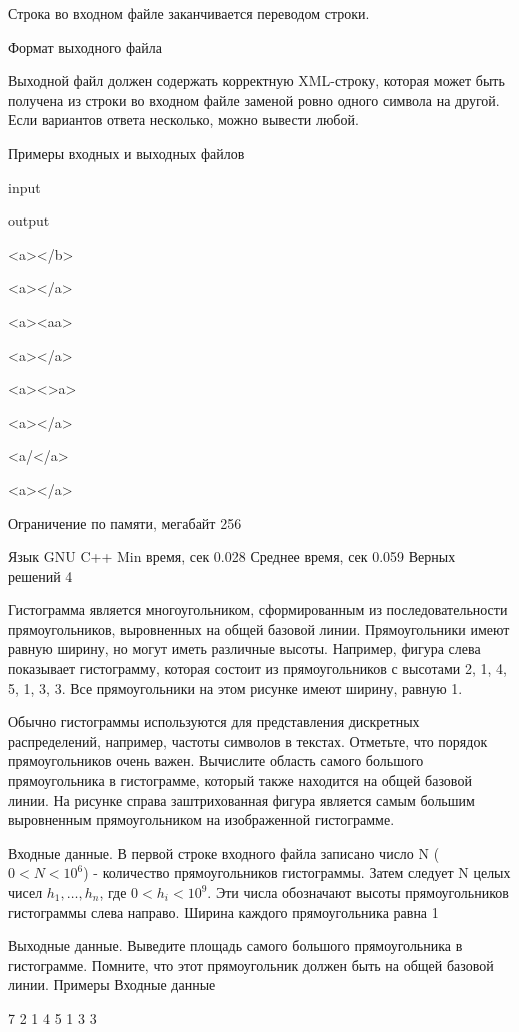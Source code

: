 \documentclass[]{article}
\begin{document}
\begin{enumerate}
Строка во входном файле заканчивается переводом строки.

Формат выходного файла

Выходной файл должен содержать корректную XML-строку, которая может быть получена из строки во входном файле заменой ровно одного символа на другой. Если вариантов ответа несколько, можно вывести любой.

Примеры входных и выходных файлов

input
	

output

<a></b>
	

<a></a>

<a><aa>
	

<a></a>

<a><>a>
	

<a></a>

<a/</a>
	

<a></a>


Ограничение по памяти, мегабайт	256
	
Язык	GNU C++
Min время, сек	0.028
Среднее время, сек	0.059
Верных решений	4

Гистограмма является многоугольником, сформированным из последовательности прямоугольников, выровненных на общей базовой линии. Прямоугольники имеют равную ширину, но могут иметь различные высоты. Например, фигура слева показывает гистограмму, которая состоит из прямоугольников с высотами 2, 1, 4, 5, 1, 3, 3. Все прямоугольники на этом рисунке имеют ширину, равную 1.

Обычно гистограммы используются для представления дискретных распределений, например, частоты символов в текстах. Отметьте, что порядок прямоугольников очень важен. Вычислите область самого большого прямоугольника в гистограмме, который также находится на общей базовой линии. На рисунке справа заштрихованная фигура является самым большим выровненным прямоугольником на изображенной гистограмме.

Входные данные. В первой строке входного файла записано число N ($0 < N < 10^6$) - количество прямоугольников гистограммы. Затем следует N целых чисел $h_1,\ldots,h_n$, где $0<h_i<10^9$. Эти числа обозначают высоты прямоугольников гистограммы слева направо. Ширина каждого прямоугольника равна 1

Выходные данные. Выведите площадь самого большого прямоугольника в гистограмме. Помните, что этот прямоугольник должен быть на общей базовой линии.
Примеры
Входные данные

7 2 1 4 5 1 3 3


\end{enumerate}
\end{document}

